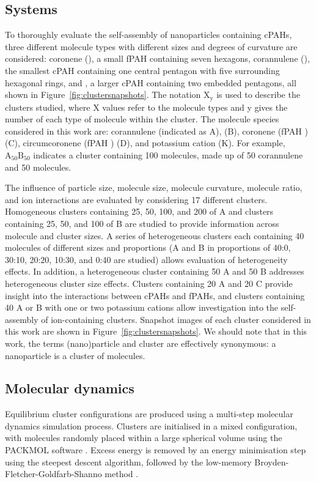 \subsection{Systems} %
To thoroughly evaluate the self-assembly of nanoparticles containing cPAHs, three different molecule types with different sizes and degrees of curvature are considered: coronene (), a small fPAH containing seven hexagons, corannulene (), the smallest cPAH containing one central pentagon with five surrounding hexagonal rings, and , a larger cPAH containing two embedded pentagons, all shown in Figure~\ref{fig:clustersnapshots}. The notation $\text{X}_{\text{y}}$ is used to describe the clusters studied, where X values refer to the molecule types and y gives the number of each type of molecule within the cluster. The molecule species considered in this work are: corannulene (indicated as A),  (B), coronene (fPAH ) (C), circumcoronene (fPAH ) (D), and potassium cation (K). For example, $\text{A}_{\text{50}}\text{B}_{\text{50}}$ indicates a cluster containing 100 molecules, made up of 50 corannulene and 50  molecules.

The influence of particle size, molecule size, molecule curvature, molecule ratio, and ion interactions are evaluated by considering 17 different clusters. Homogeneous clusters containing 25, 50, 100, and 200 of A and clusters containing 25, 50, and 100 of B are studied to provide information across molecule and cluster sizes. A series of heterogeneous clusters each containing 40 molecules of different sizes and proportions (A and B in proportions of 40:0, 30:10, 20:20, 10:30, and 0:40 are studied) allows evaluation of heterogeneity effects. In addition, a heterogeneous cluster containing 50 A and 50 B addresses heterogeneous cluster size effects. Clusters containing 20 A and 20 C provide insight into the interactions between cPAHs and fPAHs, and clusters containing 40 A or B with one or two potassium cations allow investigation into the self-assembly of ion-containing clusters. Snapshot images of each cluster considered in this work are shown in Figure~\ref{fig:clustersnapshots}. We should note that in this work, the terms (nano)particle and cluster are effectively synonymous: a nanoparticle is a cluster of molecules.

\subsection{Molecular dynamics}
Equilibrium cluster configurations are produced using a multi-step molecular dynamics simulation process. Clusters are initialised in a mixed configuration, with molecules randomly placed within a large spherical volume using the PACKMOL software \cite{Martinez2009PACKMOL}. Excess energy is removed by an energy minimisation step using the steepest descent algorithm, followed by the low-memory Broyden-Fletcher-Goldfarb-Shanno method \cite{L-BFGS}.

